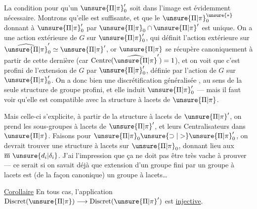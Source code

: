 
La condition pour qu'un  \(\unsure{\Pi|\pi}'_0\) soit dans
l'image est évidemment nécessaire. Montrons
qu'elle est suffisante, et que le \(\unsure{\Pi|\pi}_0^{\unsure{*}}\) donnant
 à \(\unsure{\Pi|\pi}'_0\) par \(\unsure{\Pi|\pi}_0\cap\unsure{\Pi|\pi}'\) est unique.
On a une action extérieure de \(G\) sur \(\unsure{\Pi|\pi}'_0\),
qui définit l'action extérieure sur \(\widehat{\unsure{\Pi|\pi}}'_0\simeq\unsure{\Pi|\pi}'\),
or \(\unsure{\Pi|\pi}\) se récupère canoniquement à partir de
cette dernière (car \(\mathrm{Centre}(\widehat{\unsure{\Pi|\pi}}')=1\)), et on
voit que c'est    profini de
l'extension  de \(G\) par \(\unsure{\Pi|\pi}'_0\), définie par l'action
 de \(G\) sur \(\unsure{\Pi|\pi}'_0\). On a donc bien une
discrétification généralisée , au sens de la
seule structure de  groupe profini, et elle
induit \(\unsure{\Pi|\pi}'_0\) --- mais il faut voir qu'elle
est compatible avec la structure à lacets de \(\unsure{\Pi|\pi}\).

Mais celle-ci s'explicite, à partir de la
structure à lacets de \(\unsure{\Pi|\pi}'\), on prend les
sous-groupes à lacets  de \(\unsure{\Pi|\pi}'\), et leurs
Centralisateurs dans \(\unsure{\Pi|\pi}\). Faisons  pour
\(\unsure{\Pi|\pi}_0\unsure{\supset|>}\unsure{\Pi|\pi}'_0\), on devrait trouver une structure
à lacets sur \(\unsure{\Pi|\pi}_0\), donnant lieu aux
\(\overline{\mathrm m}\ \unsure{d_i|\delta_i}\).
J'ai l'impression que ça ne
doit pas être très vache à prouver --- ce
serait  si on savait déjà que 
extension  d'un groupe fini par un
groupe à lacets est (de la façon canonique)
un groupe à lacets\ldots

\uline{Corollaire} En tous cas, l'application
\(\mathrm{Discret}(\unsure{\Pi|\pi})\longrightarrow\mathrm{Discret}(\unsure{\Pi|\pi}')\)
est \uline{injective}.

